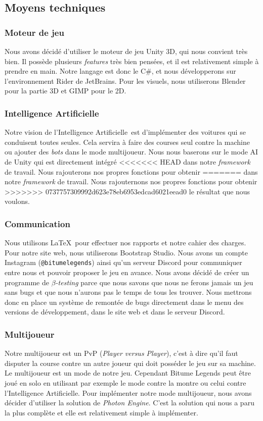 \documentclass[12pt,a4paper]{article}
\newcommand{\AI}{Intelligence Artificielle}
\begin{document}
\subsection{Moyens techniques}
\subsubsection{Moteur de jeu}
Nous avons décidé d'utiliser le moteur de jeu Unity 3D, qui nous convient très bien. Il possède plusieurs 
\textit{features} très bien pensées, et il est relativement simple à prendre en main. Notre langage est 
donc le C\#, et nous développerons sur l'environnement Rider de JetBrains. Pour les visuels, nous
utiliserons Blender pour la partie 3D et GIMP pour le 2D.
\subsubsection{\AI}
Notre vision de l'\AI\, est d'implémenter des voitures qui se conduisent toutes seules.
Cela servira à faire des courses seul contre la machine ou ajouter des \textit{bots} dans le mode 
multijoueur. Nous nous baserons sur le mode AI de Unity qui est directement intégré
<<<<<<< HEAD
dans notre \textit{framework} de travail. Nous rajouterons nos propres fonctions pour obtenir
=======
dans notre \textit{framework} de travail. Nous rajouternons nos propres fonctions pour obtenir
>>>>>>> 0737757309992d623e78eb6953edcad6021eead0
le résultat que nous voulons.
\subsubsection{Communication}
Nous utilisons \LaTeX\, pour effectuer nos rapports et notre cahier des charges. Pour notre site web, 
nous utiliserons Bootstrap Studio. Nous avons un compte Instagram (\texttt{@bitumelegends}) 
ainsi qu'un serveur Discord pour communiquer entre nous et pouvoir proposer le jeu en avance.
Nous avons décidé de créer un programme de \(\beta\)\textit{-testing} parce que nous savons que nous 
ne ferons jamais un jeu sans bugs et que nous n'aurons pas le temps de tous les trouver. Nous mettrons
donc en place un système de remontée de bugs directement dans le menu des versions de développement, 
dans le site web et dans le serveur Discord.
\subsubsection{Multijoueur}
Notre multijoueur est un PvP (\textit{Player versus Player}), c'est à dire qu'il faut disputer la course 
contre un autre joueur qui doit posséder le jeu sur sa machine. Le multijoueur est un mode de notre jeu. 
Cependant Bitume Legends peut être joué en solo en utilisant par exemple le mode contre la montre ou 
celui contre l'Intelligence Artificielle. Pour implémenter notre mode multijoueur, nous avons décider 
d'utiliser la solution de \emph{Photon Engine}. C'est la solution qui nous a paru la plus complète et 
elle est relativement simple à implémenter.
\end{document}
